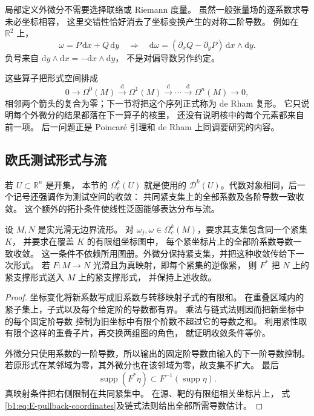 局部定义外微分不需要选择联络或 Riemann 度量。
虽然一般张量场的逐系数求导未必坐标相容，
这里交错性恰好消去了坐标变换产生的对称二阶导数。
例如在 \(\mathbb R^2\) 上，
\[
 \omega=P\,\mathrm dx+Q\,\mathrm dy
 \quad\Longrightarrow\quad
 \mathrm d\omega=(\partial_xQ-\partial_yP)\,
                        \mathrm dx\wedge\mathrm dy.
\]
负号来自 \(\mathrm dy\wedge\mathrm dx=-\mathrm dx\wedge\mathrm dy\)，
不是对偏导数另作约定。

\ProseParagraphBreak

这些算子把形式空间排成
\[
 0\longrightarrow\Omega^0(M)
 \xrightarrow{\mathrm d}\Omega^1(M)
 \xrightarrow{\mathrm d}\cdots
 \xrightarrow{\mathrm d}\Omega^n(M)
 \longrightarrow0,
\]
相邻两个箭头的复合为零；下一节将把这个序列正式称为 de Rham 复形。
它只说明每个外微分的结果都落在下一算子的核里，
还没有说明核中的每个元素都来自前一项。
后一问题正是 Poincaré 引理和 de Rham 上同调要研究的内容。

\subsection{欧氏测试形式与流}
\label{b1:subsec:E10304}

若 \(U\subset\mathbb R^n\) 是开集，
本节的 \(\Omega_c^k(U)\) 就是使用的
\(\mathcal D^k(U)\)。代数对象相同，后一个记号还强调作为测试空间的收敛：
共同紧支集上的全部系数及各阶导数一致收敛。
这个额外的拓扑条件使线性泛函能够表达分布与流。

\begin{proposition}[紧支撑与坐标中的测试收敛]\label{b1:prop:E-test-forms}
设 \(M,N\) 是实光滑无边界流形。
对 \(\omega_j,\omega\in\Omega_c^k(M)\)，要求其支集包含同一个紧集 \(K\)，
并要求在覆盖 \(K\) 的有限组坐标图中，
每个紧坐标片上的全部阶系数导数一致收敛。
这一条件不依赖所用图册。外微分保持紧支集，并把这种收敛传给下一次形式。
若 \(F:M\to N\) 光滑且为真映射，即每个紧集的逆像紧，
则 \(F^*\) 把 \(N\) 上的紧支撑形式送入 \(M\) 上的紧支撑形式，
并保持上述收敛。
\end{proposition}
\begin{proof}
坐标变化将新系数写成旧系数与转移映射子式的有限和。
在重叠区域内的紧子集上，子式以及每个给定阶的导数都有界。
乘法与链式法则因而把新坐标中的每个固定阶导数
控制为旧坐标中有限个阶数不超过它的导数之和。
利用紧性取有限个这样的重叠子片，再交换两组图的角色，
就证明收敛条件等价。

外微分只使用系数的一阶导数，所以输出的固定阶导数由输入的下一阶导数控制。
若原形式在某邻域为零，其外微分也在该邻域为零，故支集不扩大。
最后
\[
 \operatorname{supp}(F^*\eta)\subset F^{-1}(\operatorname{supp}\eta).
\]
真映射条件把右侧限制在共同紧集中。
在源、靶的有限组相关坐标片上，
式\eqref{b1:eq:E-pullback-coordinates}及链式法则给出全部所需导数估计。
\end{proof}

